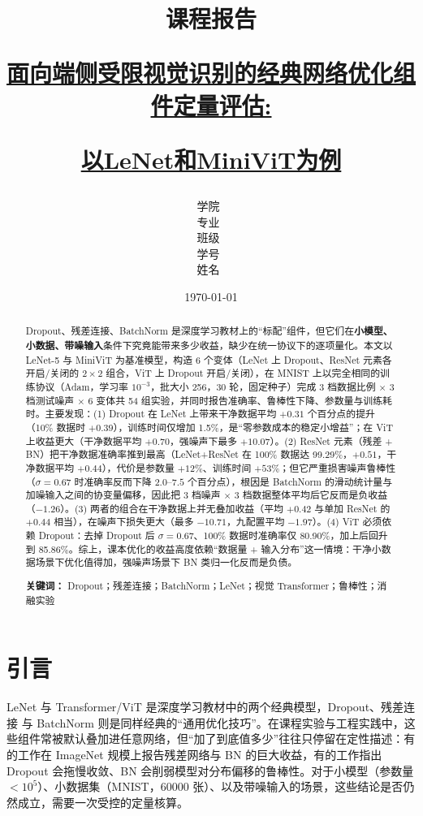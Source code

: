 \documentclass[12pt,hyperref,a4paper,UTF8]{ctexart}
\title{ 
        \vspace{0.3cm}
        \heiti \Huge \textbf{{课程报告}} \par
        \vspace{0.8cm} 
        \heiti \Large {\underline{面向端侧受限视觉识别的经典网络优化组件定量评估:}} \par
        \vspace{0.35cm}
        \heiti \Large {\underline{以LeNet和MiniViT为例}}    
        \vspace{1.2cm}
    }
\author{
        \vspace{0.5cm}
        \kaishu\Large 学院\ \dlmu[9cm]{人工智能学院} \\ %
        \vspace{0.5cm}
        \kaishu\Large 专业\ \dlmu[9cm]{人工智能} \\ %
        \vspace{0.5cm}
        \kaishu\Large 班级\ \dlmu[9cm]{2426001} \\ %
        \vspace{0.5cm}
        \kaishu\Large 学号\ \dlmu[9cm]{242600101} \qquad  \\ %
        \vspace{0.5cm}
        \kaishu\Large 姓名\ \dlmu[9cm]{张石彬} \qquad \\ %
    }
\date{\today} %
\begin{document}
\pagestyle{empty} %
\cover

\begin{abstract}
Dropout、残差连接、BatchNorm 是深度学习教材上的“标配”组件，但它们在\textbf{小模型、小数据、带噪输入}条件下究竟能带来多少收益，缺少在统一协议下的逐项量化。本文以 LeNet-5 与 MiniViT 为基准模型，构造 6 个变体（LeNet 上 Dropout、ResNet 元素各开启/关闭的 $2\times2$ 组合，ViT 上 Dropout 开启/关闭），在 MNIST 上以完全相同的训练协议（Adam，学习率 $10^{-3}$，批大小 256，30 轮，固定种子）完成 3 档数据比例 $\times$ 3 档测试噪声 $\times$ 6 变体共 54 组实验，并同时报告准确率、鲁棒性下降、参数量与训练耗时。主要发现：(1) Dropout 在 LeNet 上带来干净数据平均 $+0.31$ 个百分点的提升（10\% 数据时 $+0.39$），训练时间仅增加 1.5\%，是“零参数成本的稳定小增益”；在 ViT 上收益更大（干净数据平均 $+0.70$，强噪声下最多 $+10.07$）。(2) ResNet 元素（残差 + BN）把干净数据准确率推到最高（LeNet+ResNet 在 100\% 数据达 99.29\%，$+0.51$，干净数据平均 $+0.44$），代价是参数量 $+12\%$、训练时间 $+53\%$；但它严重损害噪声鲁棒性（$\sigma=0.67$ 时准确率反而下降 $2.0$--$7.5$ 个百分点），根因是 BatchNorm 的滑动统计量与加噪输入之间的协变量偏移，因此把 3 档噪声 $\times$ 3 档数据整体平均后它反而是负收益（$-1.26$）。(3) 两者的组合在干净数据上并无叠加收益（平均 $+0.42$ 与单加 ResNet 的 $+0.44$ 相当），在噪声下损失更大（最多 $-10.71$，九配置平均 $-1.97$）。(4) ViT 必须依赖 Dropout：去掉 Dropout 后 $\sigma=0.67$、100\% 数据时准确率仅 80.90\%，加上后回升到 85.86\%。综上，课本优化的收益高度依赖“数据量 + 输入分布”这一情境：干净小数据场景下优化值得加，强噪声场景下 BN 类归一化反而是负债。

\vspace{0.5em}
\noindent\textbf{关键词：} Dropout；残差连接；BatchNorm；LeNet；视觉 Transformer；鲁棒性；消融实验
\end{abstract}

\thispagestyle{empty} %

\newpage
\pagestyle{fancy} %
\setcounter{page}{1} %

\section{引言}

LeNet\cite{lecun1998gradient} 与 Transformer/ViT\cite{vaswani2017attention,dosovitskiy2021image} 是深度学习教材中的两个经典模型，Dropout\cite{srivastava2014dropout}、残差连接\cite{he2016deep} 与 BatchNorm\cite{ioffe2015batch} 则是同样经典的“通用优化技巧”。在课程实验与工程实践中，这些组件常被默认叠加进任意网络，但“加了到底值多少”往往只停留在定性描述：有的工作在 ImageNet 规模上报告残差网络与 BN 的巨大收益，有的工作指出 Dropout 会拖慢收敛、BN 会削弱模型对分布偏移的鲁棒性。对于小模型（参数量 $<10^{5}$）、小数据集（MNIST，60000 张）、以及带噪输入的场景，这些结论是否仍然成立，需要一次受控的定量核算。
\end{document}

